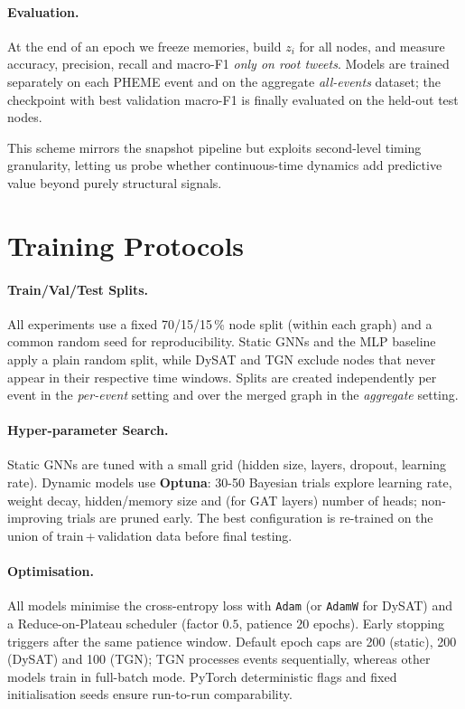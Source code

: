 \documentclass{cshonours}
\begin{document}
\paragraph{Evaluation.}
At the end of an epoch we freeze memories, build $z_i$ for all nodes, and measure accuracy, precision, recall and macro-F1 \emph{only on root tweets}.  
Models are trained separately on each PHEME event and on the aggregate \emph{all-events} dataset; the checkpoint with best validation macro-F1 is finally evaluated on the held-out test nodes.

This scheme mirrors the snapshot pipeline but exploits second-level timing granularity, letting us probe whether continuous-time dynamics add predictive value beyond purely structural signals.


\section{Training Protocols}

\paragraph{Train/Val/Test Splits.}
All experiments use a fixed 70/15/15\,\% node split (within each graph) and a common random seed for reproducibility.  
Static GNNs and the MLP baseline apply a plain random split, while DySAT and TGN exclude nodes that never appear in their respective time windows.  
Splits are created independently per event in the \emph{per-event} setting and over the merged graph in the \emph{aggregate} setting.

\paragraph{Hyper-parameter Search.}
Static GNNs are tuned with a small grid (hidden size, layers, dropout, learning rate).  
Dynamic models use \textbf{Optuna}: 30-50 Bayesian trials explore learning rate, weight decay, hidden/memory size and (for GAT layers) number of heads; non-improving trials are pruned early.  
The best configuration is re-trained on the union of train\,+\,validation data before final testing.

\paragraph{Optimisation.}
All models minimise the cross-entropy loss with \texttt{Adam} (or \texttt{AdamW} for DySAT) and a Reduce-on-Plateau scheduler (factor $0.5$, patience $20$ epochs).  
Early stopping triggers after the same patience window.  
Default epoch caps are 200 (static), 200 (DySAT) and 100 (TGN); TGN processes events sequentially, whereas other models train in full-batch mode.  
PyTorch deterministic flags and fixed initialisation seeds ensure run-to-run comparability.
\end{document}

